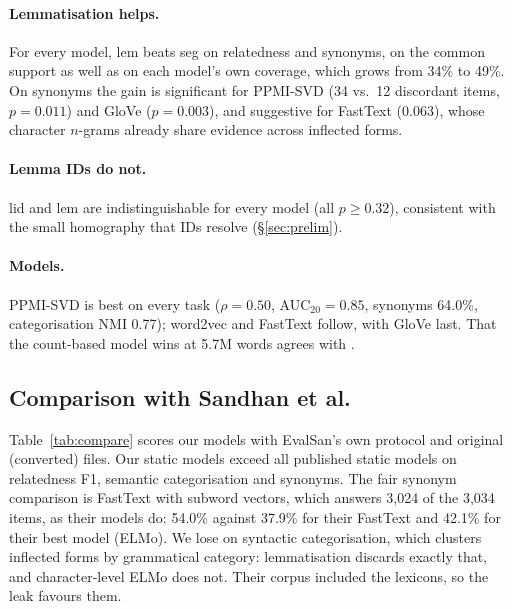 \documentclass[11pt]{article}
\newcommand{\vk}[1]{\textsf{#1}}
\begin{document}
\begin{table}[t]\centering\footnotesize
\setlength{\tabcolsep}{2.2pt}

\caption{Common support: $\rho$, synonym accuracy (\%), and Holm-adjusted
McNemar $p$ for \vk{seg}$\to$\vk{lem} and \vk{lem}$\to$\vk{lid}.}
\label{tab:rq1}
\end{table}

\paragraph{Lemmatisation helps.} For every model, \vk{lem} beats \vk{seg} on
relatedness and synonyms, on the common support as well as on each model's
own coverage, which grows from 34\% to 49\%. On synonyms the gain is
significant for PPMI-SVD (34 vs.\ 12 discordant items, $p=0.011$)
and GloVe ($p=0.003$), and suggestive for FastText (0.063),
whose character $n$-grams already share evidence across inflected forms.

\paragraph{Lemma IDs do not.} \vk{lid} and \vk{lem} are indistinguishable for
every model (all $p\ge0.32$), consistent with the small
homography that IDs resolve (\S\ref{sec:prelim}).

\paragraph{Models.} PPMI-SVD is best on every task ($\rho=0.50$,
AUC$_{20}=0.85$, synonyms 64.0\%, categorisation NMI 0.77); word2vec and
FastText follow, with GloVe last. That the count-based model wins at 5.7M words agrees with
\citet{levy2015improving}.

\subsection{Comparison with Sandhan et al.}
Table~\ref{tab:compare} scores our models with EvalSan's own protocol and
original (converted) files. Our static models exceed all published static
models on relatedness F1, semantic categorisation and synonyms. The fair
synonym comparison is FastText with subword vectors, which answers 3,024 of
the 3,034 items, as their models do: 54.0\% against 37.9\% for their
FastText and 42.1\% for their best model (ELMo). We lose on syntactic
categorisation, which clusters inflected forms by grammatical category:
lemmatisation discards exactly that, and character-level ELMo does not.
Their corpus included the lexicons, so the leak favours them.
\end{document}
